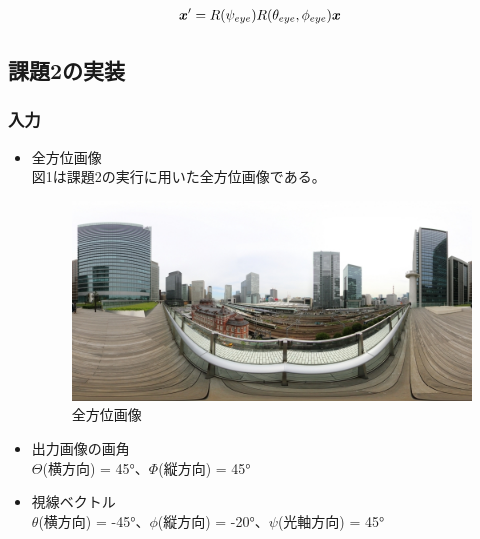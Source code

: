 \documentclass[]{jarticle}          %
\begin{document}
\begin{equation}
  \mbox{\boldmath $x$}'=R(\psi_{eye})R(\theta_{eye},\phi_{eye})\mbox{\boldmath $x$}
  \label{eq18}
\end{equation}

\subsection{課題2の実装}
\subsubsection{入力}
\begin{itemize}
  \item 全方位画像 \\ 図1は課題2の実行に用いた全方位画像である。
  \begin{figure}[!ht]
    \begin{center}
      \includegraphics[scale=0.4]{figures/kadai2.jpg}
      \caption{全方位画像}
      \label{one}
    \end{center}
  \end{figure}
  \item 出力画像の画角 \\ $\Theta$(横方向) = 45°、$\Phi$(縦方向) = 45°
  \item 視線ベクトル \\ $\theta$(横方向) = -45°、$\phi$(縦方向) = -20°、$\psi$(光軸方向) = 45°
\end{itemize}
\end{document}
